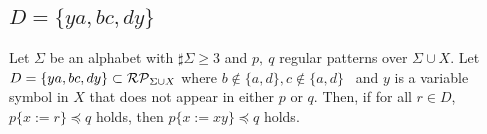 
\subsection{$D = \{ ya, bc, dy \}$}\label{subsec:d3a}

\newcommand{\TheConditionA}{$b \not\in \{a,d\} \mbox{~and~} c \not\in \{a,d\}$}
\newcommand{\TheConditionAComma}{$b \not\in \{a,d\}, c \not\in \{a,d\}$}
\newcommand{\TheConditionAprime}{{\color{red}$b \neq a \mbox{~and~} c \neq d$}}
\newcommand{\TheConditionB}{$b = a,~b \not= d, \mbox{~and~} c \not\in \{a,d\}$}
\newcommand{\TheConditionBsub}{$c \not\in \{a,d\}$}
\newcommand{\TheConditionC}{$b \not\in \{a, d\},~c \not= a, \mbox{~and~} c = d$}

\begin{lem}\label{lem:addpart}
  Let $\Sigma$ be an alphabet with $\sharp\Sigma \ge 3$ and $p,~q$ regular patterns {\color{red}over} $\Sigma\cup X$.
  {\color{red} Let $D = \{ ya, bc, dy \} \subset \mathcal{RP}_{\Sigma\cup X}$ 
  where \TheConditionAComma~  and 
  $y$ is a variable symbol in $X$ that does not appear in {\color{red}either }$p$ {\color{red}or} $q$.}
  Then, {\color{red} if for all $r \in D$, $p \{ x := r \} \preceq q$ holds,} then $p \{ x := xy \} \preceq q$ {\color{red} holds}.
\end{lem}

